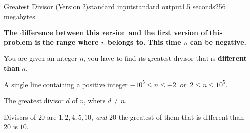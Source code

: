 \begin{problem}{Greatest Divisor (Version 2)}{standard input}{standard output}{1.5 seconds}{256 megabytes}

\textbf{The difference between this version and the first version of this problem is the range where $n$ belongs to. This time $n$ can be negative.}

You are given an integer $n$, you have to find its greatest divisor that is \textbf{different than} $n$.

\InputFile
A single line containing a positive integer $ -10^5 \leq n \leq -2 \;\; or \;\; 2 \leq n \leq 10^5 $.

\OutputFile
The greatest divisor $d$ of $n$, where $d \neq n$.

\Example

\begin{example}
%
\end{example}

\Note
Divisors of $20$ are $1, 2, 4, 5, 10, \; and \; 20$ the greatest of them that is different than $20$ is $10$. 

\end{problem}

